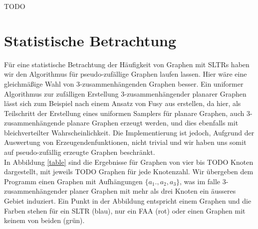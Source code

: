 TODO

\section{Statistische Betrachtung}

Für eine statistische Betrachtung der Häufigkeit von Graphen mit SLTRs haben wir den Algorithmus für pseudo-zufällige Graphen laufen lassen. Hier wäre eine gleichmäßige Wahl von 3-zusammenhängenden Graphen besser. Ein uniformer Algorithmus zur zufälligen Erstellung 3-zusammenhängender planarer Graphen lässt sich zum Beispiel nach einem Ansatz von Fusy aus \cite{fusy07} erstellen, da hier, als Teilschritt der Erstellung eines uniformen Samplers für planare Graphen, auch 3-zusammenhängende planare Graphen erzeugt werden, und dies ebenfalls mit bleichverteilter Wahrscheinlichkeit. Die Implementierung ist jedoch, Aufgrund der Auswertung von Erzeugendenfunktionen, nicht trivial und wir haben uns somit auf pseudo-zufällig erzeugte Graphen beschränkt. \\

In Abbildung \ref{table} sind die Ergebnisse für Graphen von vier bis TODO Knoten dargestellt, mit jeweils TODO Graphen für jede Knotenzahl. Wir übergeben dem Programm einen Graphen mit Aufhängungen $\{a_1.,a_2,a_3\}$, was im falle 3-zusammenhängender planer Graphen mit mehr als drei Knoten ein äusseres Gebiet induziert. Ein Punkt in der Abbildung entspricht einem Graphen und die Farben stehen für ein SLTR (blau), nur ein FAA (rot) oder einen Graphen mit keinem von beiden (grün).




